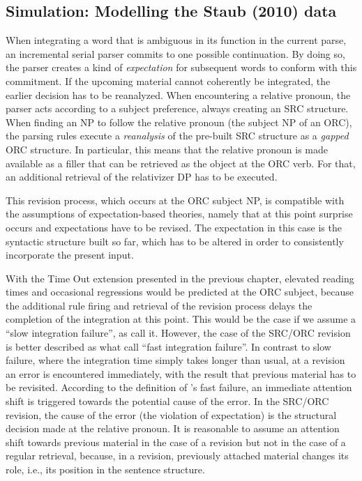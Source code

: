 \documentclass{cambridge7A}\usepackage[]{graphicx}\usepackage[]{color}
\begin{document}
\subsection{Simulation: Modelling the Staub (2010) data}
When integrating a word that is ambiguous in its function in the current parse, an incremental serial parser commits to one possible continuation. By doing so, the parser creates a kind of \emph{expectation} for subsequent words to conform with this commitment. If the upcoming material cannot coherently be integrated, the earlier decision has to be reanalyzed.
When encountering a relative pronoun, the \cite{LewisVasishth2005} parser acts according to a subject preference, always creating an SRC structure.
When finding an NP to follow the relative pronoun (the subject NP of an ORC), the parsing rules execute a \emph{reanalysis} of the pre-built  SRC structure as a \emph{gapped}  ORC structure. In particular, this means that the relative pronoun is made available as a filler that can be retrieved as the object at the ORC verb. For that, an additional retrieval of the relativizer DP has to be executed. 

This revision process, which occurs at the ORC subject NP, is compatible with the assumptions of expectation-based theories, namely that at this point surprise occurs and expectations have to be revised. The expectation in this case is the syntactic structure built so far, which has to be altered in order to consistently incorporate the present input.

With the Time Out extension presented in the previous chapter, elevated reading times and occasional regressions would be predicted at the ORC subject, because the additional rule firing and retrieval of the revision process delays the completion of the integration at this point. This would be the case if we assume a ``slow integration failure'', as \cite{ReichleWarrenMcConnell2009} call it. However, the case of the SRC/ORC revision is better described as what \cite{ReichleWarrenMcConnell2009} call ``fast integration failure''. In contrast to slow failure, where  the integration time simply takes longer than usual, at a revision an error is encountered immediately, with the result that previous material has to be revisited. 
According to the definition of \cite{ReichleWarrenMcConnell2009}'s fast failure, an immediate attention shift is triggered towards the potential cause of the error. In the SRC/ORC revision, the cause of the error (the violation of expectation) is the structural decision made at the relative pronoun.
It is reasonable to assume an attention shift towards previous material in the case of a revision but not in the case of a regular retrieval, because, in a revision, previously attached material changes its role, i.e., its position in the sentence structure. 
\end{document}
